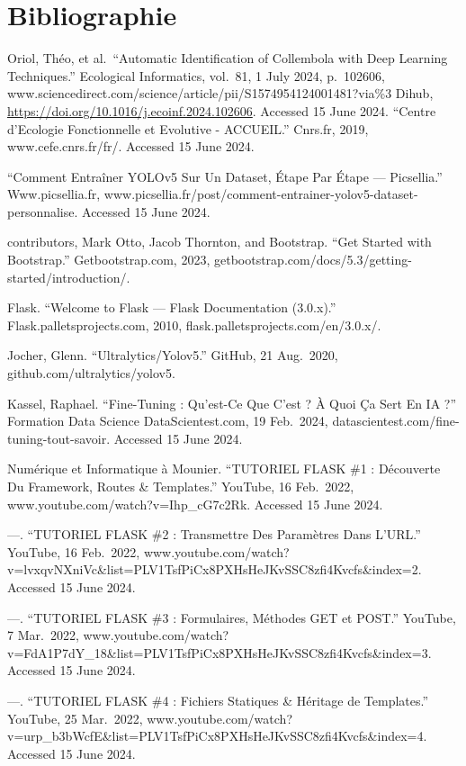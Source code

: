 \documentclass[
  10pt,
]{article}
\begin{document}
\newpage

\section{Bibliographie}\label{bibliographie}

Oriol, Théo, et al.~``Automatic Identification of Collembola with Deep
Learning Techniques.'' Ecological Informatics, vol.~81, 1 July 2024,
p.~102606,
www.sciencedirect.com/science/article/pii/S1574954124001481?via\%3
Dihub, \url{https://doi.org/10.1016/j.ecoinf.2024.102606}. Accessed 15
June 2024. ``Centre d'Ecologie Fonctionnelle et Evolutive - ACCUEIL.''
Cnrs.fr, 2019, www.cefe.cnrs.fr/fr/. Accessed 15 June 2024.

``Comment Entraîner YOLOv5 Sur Un Dataset, Étape Par Étape ---
Picsellia.'' Www.picsellia.fr,
www.picsellia.fr/post/comment-entrainer-yolov5-dataset-personnalise.
Accessed 15 June 2024.

contributors, Mark Otto, Jacob Thornton, and Bootstrap. ``Get Started
with Bootstrap.'' Getbootstrap.com, 2023,
getbootstrap.com/docs/5.3/getting-started/introduction/.

Flask. ``Welcome to Flask --- Flask Documentation (3.0.x).''
Flask.palletsprojects.com, 2010, flask.palletsprojects.com/en/3.0.x/.

Jocher, Glenn. ``Ultralytics/Yolov5.'' GitHub, 21 Aug.~2020,
github.com/ultralytics/yolov5.

Kassel, Raphael. ``Fine-Tuning : Qu'est-Ce Que C'est ? À Quoi Ça Sert En
IA ?'' Formation Data Science \textbar{} DataScientest.com, 19
Feb.~2024, datascientest.com/fine-tuning-tout-savoir. Accessed 15 June
2024.

Numérique et Informatique à Mounier. ``TUTORIEL FLASK \#1 : Découverte
Du Framework, Routes \& Templates.'' YouTube, 16 Feb.~2022,
www.youtube.com/watch?v=Ihp\_cG7c2Rk. Accessed 15 June 2024.

---. ``TUTORIEL FLASK \#2 : Transmettre Des Paramètres Dans L'URL.''
YouTube, 16 Feb.~2022,
www.youtube.com/watch?v=lvxqvNXniVc\&list=PLV1TsfPiCx8PXHsHeJKvSSC8zfi4Kvcfs\&index=2.
Accessed 15 June 2024.

---. ``TUTORIEL FLASK \#3 : Formulaires, Méthodes GET et POST.''
YouTube, 7 Mar.~2022,
www.youtube.com/watch?v=FdA1P7dY\_18\&list=PLV1TsfPiCx8PXHsHeJKvSSC8zfi4Kvcfs\&index=3.
Accessed 15 June 2024.

---. ``TUTORIEL FLASK \#4 : Fichiers Statiques \& Héritage de
Templates.'' YouTube, 25 Mar.~2022,
www.youtube.com/watch?v=urp\_b3bWcfE\&list=PLV1TsfPiCx8PXHsHeJKvSSC8zfi4Kvcfs\&index=4.
Accessed 15 June 2024.
\end{document}
